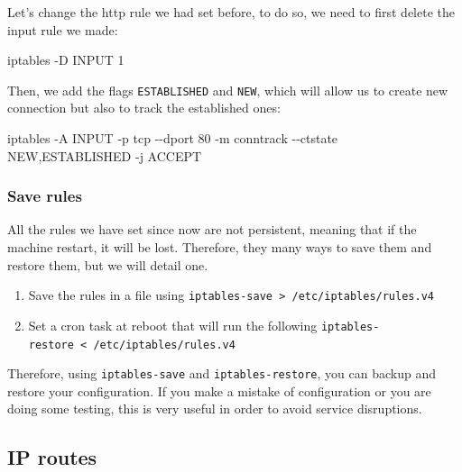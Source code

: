 \documentclass[a4paper,11pt,singlespacing]{article}
\newenvironment{Shaded}{}{}
\newcommand{\AttributeTok}[1]{\textcolor[rgb]{0.49,0.56,0.16}{#1}}
\newcommand{\ExtensionTok}[1]{#1}
\newcommand{\NormalTok}[1]{#1}
\providecommand{\tightlist}{%
  \setlength{\itemsep}{0pt}\setlength{\parskip}{0pt}}
\begin{document}
Let's change the http rule we had set before, to do so, we need to first
delete the input rule we made:

\begin{Shaded}
\begin{Highlighting}[]
\ExtensionTok{iptables} \AttributeTok{{-}D}\NormalTok{ INPUT 1}
\end{Highlighting}
\end{Shaded}

Then, we add the flags \texttt{ESTABLISHED} and \texttt{NEW}, which will
allow us to create new connection but also to track the established
ones:

\begin{Shaded}
\begin{Highlighting}[]
    \ExtensionTok{iptables} \AttributeTok{{-}A}\NormalTok{ INPUT }\AttributeTok{{-}p}\NormalTok{ tcp }\AttributeTok{{-}{-}dport}\NormalTok{ 80 }\AttributeTok{{-}m}\NormalTok{ conntrack }\AttributeTok{{-}{-}ctstate}\NormalTok{ NEW,ESTABLISHED }\AttributeTok{{-}j}\NormalTok{ ACCEPT}
\end{Highlighting}
\end{Shaded}

\subsubsection{Save rules}\label{save-rules}

All the rules we have set since now are not persistent, meaning that if
the machine restart, it will be lost. Therefore, they many ways to save
them and restore them, but we will detail one.

\begin{enumerate}
\def\labelenumi{\arabic{enumi}.}
\tightlist
\item
  Save the rules in a file using
  \texttt{iptables-save\ \textgreater{}\ /etc/iptables/rules.v4}
\item
  Set a cron task at reboot that will run the following
  \texttt{iptables-restore\ \textless{}\ /etc/iptables/rules.v4}
\end{enumerate}

Therefore, using \texttt{iptables-save} and \texttt{iptables-restore},
you can backup and restore your configuration. If you make a mistake of
configuration or you are doing some testing, this is very useful in
order to avoid service disruptions.

\subsection{IP routes}\label{ip-routes}
\end{document}
